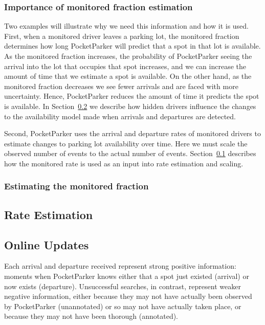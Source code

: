 \subsubsection{Importance of monitored fraction estimation}

Two examples will illustrate why we need this information and how it is used.
First, when a monitored driver leaves a parking lot, the monitored fraction
determines how long PocketParker will predict that a spot in that lot is
available. As the monitored fraction increases, the probability of
PocketParker seeing the arrival into the lot that occupies that spot
increases, and we can increase the amount of time that we estimate a spot is
available. On the other hand, as the monitored fraction decreases we see
fewer arrivals and are faced with more uncertainty. Hence, PocketParker
reduces the amount of time it predicts the spot is available. In
Section~\ref{subsec-online} we describe how hidden drivers influence the
changes to the availability model made when arrivals and departures are
detected.

Second, PocketParker uses the arrival and departure rates of monitored
drivers to estimate changes to parking lot availability over time. Here we
must scale the observed number of events to the actual number of events.
Section~\ref{subsec-rates} describes how the monitored rate is used as an
input into rate estimation and scaling.

\subsubsection{Estimating the monitored fraction}

\subsection{Rate Estimation}
\label{subsec-rates}

\subsection{Online Updates}
\label{subsec-online}

Each arrival and departure received represent strong positive information:
moments when PocketParker knows either that a spot just existed (arrival) or
now exists (departure). Unsuccessful searches, in contrast, represent weaker
negative information, either because they may not have actually been observed
by PocketParker (unannotated) or so may not have actually taken place, or
because they may not have been thorough (annotated).
